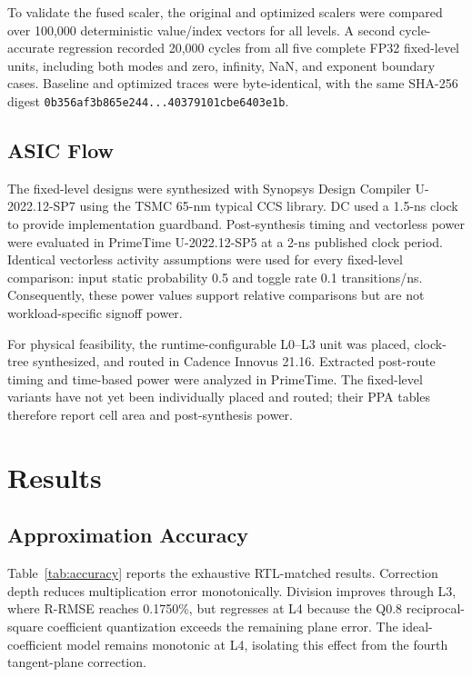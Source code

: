 \documentclass[conference]{IEEEtran}
\begin{document}
To validate the fused scaler, the original and optimized scalers were compared
over 100,000 deterministic value/index vectors for all levels. A second
cycle-accurate regression recorded 20,000 cycles from all five complete FP32
fixed-level units, including both modes and zero, infinity, NaN, and exponent
boundary cases. Baseline and optimized traces were byte-identical, with the
same SHA-256 digest
\texttt{0b356af3b865e244...40379101cbe6403e1b}.

\subsection{ASIC Flow}
The fixed-level designs were synthesized with Synopsys Design Compiler
U-2022.12-SP7 using the TSMC 65-nm typical CCS library. DC used a 1.5-ns clock
to provide implementation guardband. Post-synthesis timing and vectorless power
were evaluated in PrimeTime U-2022.12-SP5 at a 2-ns published clock period.
Identical vectorless activity assumptions were used for every fixed-level
comparison: input static probability 0.5 and toggle rate 0.1 transitions/ns.
Consequently, these power values support relative comparisons but are not
workload-specific signoff power.

For physical feasibility, the runtime-configurable L0--L3 unit was placed,
clock-tree synthesized, and routed in Cadence Innovus 21.16. Extracted
post-route timing and time-based power were analyzed in PrimeTime. The
fixed-level variants have not yet been individually placed and routed; their
PPA tables therefore report cell area and post-synthesis power.

\section{Results}
\subsection{Approximation Accuracy}
Table~\ref{tab:accuracy} reports the exhaustive RTL-matched results. Correction
depth reduces multiplication error monotonically. Division improves through
L3, where R-RMSE reaches 0.1750\%, but regresses at L4 because the Q0.8
reciprocal-square coefficient quantization exceeds the remaining plane error.
The ideal-coefficient model remains monotonic at L4, isolating this effect from
the fourth tangent-plane correction.
\end{document}
